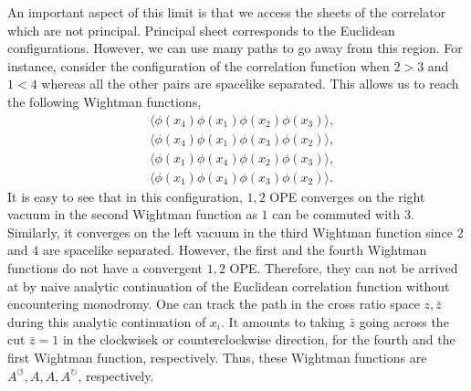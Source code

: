 An important aspect of this limit is that we access the sheets of the correlator which are not principal.
Principal sheet corresponds to the Euclidean configurations.
However, we can use many paths to go away from this region.
For instance, consider the configuration of the correlation function when $ 2 > 3  $ and $ 1 < 4 $ whereas all the other pairs are spacelike separated.
This allows us to reach the following Wightman functions,
\begin{align}
   & \langle \phi\left( x_4 \right)\phi\left( x_1 \right)\phi\left( x_2 \right)\phi\left( x_3 \right) \rangle, \nonumber \\
   & \langle \phi\left( x_4 \right)\phi\left( x_1 \right)\phi\left( x_3 \right)\phi\left( x_2 \right) \rangle, \nonumber \\
   & \langle \phi\left( x_1 \right)\phi\left( x_4 \right)\phi\left( x_2 \right)\phi\left( x_3 \right) \rangle, \nonumber \\
   & \langle \phi\left( x_1 \right)\phi\left( x_4 \right)\phi\left( x_3 \right)\phi\left( x_2 \right) \rangle
  .\end{align}
It is easy to see that in this configuration, $ 1,2 $ OPE converges on the right vacuum in the second Wightman function as $ 1 $ can be commuted with $ 3 $.
Similarly, it converges on the left vacuum in the third Wightman function since $ 2 $ and $ 4 $ are spacelike separated.
However, the first and the fourth Wightman functions do not have a convergent $ 1,2 $ OPE.
Therefore, they can not be arrived at by naive analytic continuation of the Euclidean correlation function without encountering monodromy.
One can track the path in the cross ratio space $ z,\bar{z} $ during this analytic continuation of $ x_i $.
It amounts to taking $ \bar{z} $ going across the cut $ \bar{z} = 1 $ in the clockwisek or counterclockwise direction, for the fourth and the first Wightman function, respectively.
Thus, these Wightman functions are $ A^\circlearrowleft,A,A,A^\circlearrowright $, respectively.

